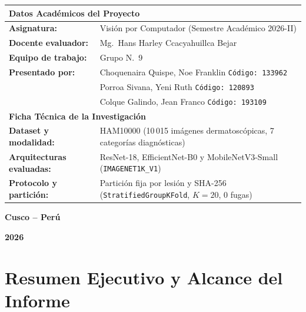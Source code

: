 \documentclass[10pt,a4paper]{article}
\renewcommand{\arraystretch}{1.3}
\begin{document}
\begin{titlepage}
\vspace{0.32cm}
\begin{flushleft}
\small
\renewcommand{\arraystretch}{1.18}
\begin{tabularx}{\textwidth}{@{}p{4.3cm}>{\raggedright\arraybackslash}X@{}}
\toprule
\multicolumn{2}{l}{\textbf{Datos Académicos del Proyecto}} \\ \midrule
\textbf{Asignatura:} & Visión por Computador (Semestre Académico 2026-II) \\
\textbf{Docente evaluador:} & Mg.\ Hans Harley Ccacyahuillca Bejar \\
\textbf{Equipo de trabajo:} & Grupo N.\ 9 \\
\textbf{Presentado por:} & Choquenaira Quispe, Noe Franklin \hfill \texttt{Código: 133962} \\
                         & Porroa Sivana, Yeni Ruth \hfill \texttt{Código: 120893} \\
                         & Colque Galindo, Jean Franco \hfill \texttt{Código: 193109} \\
\midrule
\multicolumn{2}{l}{\textbf{Ficha Técnica de la Investigación}} \\ \midrule
\textbf{Dataset y modalidad:} & HAM10000 (10\,015 imágenes dermatoscópicas, 7 categorías diagnósticas) \\
\textbf{Arquitecturas evaluadas:} & ResNet-18, EfficientNet-B0 y MobileNetV3-Small (\texttt{IMAGENET1K\_V1}) \\
\textbf{Protocolo y partición:} & Partición fija por lesión y SHA-256 (\texttt{StratifiedGroupKFold}, $K=20$, 0 fugas) \\
\bottomrule
\end{tabularx}
\end{flushleft}

\vfill
{\normalsize\bfseries Cusco -- Perú\par}
\vspace{0.06cm}
{\normalsize\bfseries 2026\par}
\end{titlepage}
\hypersetup{pageanchor=true}

\section*{Resumen Ejecutivo y Alcance del Informe}
\end{document}
